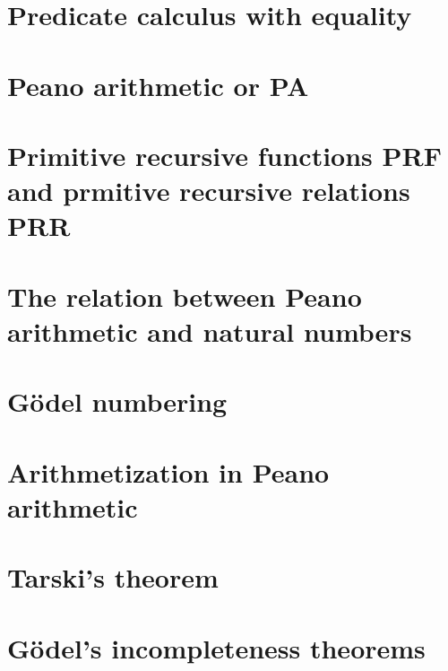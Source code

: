 \documentclass[11pt,a4paper]{article}
\begin{document}
\section{Predicate calculus with equality}

\section{Peano arithmetic or PA}

\section{Primitive recursive functions PRF and prmitive recursive relations PRR}

\section{The relation between Peano arithmetic and natural numbers}

\section{Gödel numbering}

\section{Arithmetization in Peano arithmetic}

\section{Tarski's theorem}

\section{Gödel's incompleteness theorems}

{\raggedright%
\printbibliography[heading=bibintoc]%
}
\end{document}
